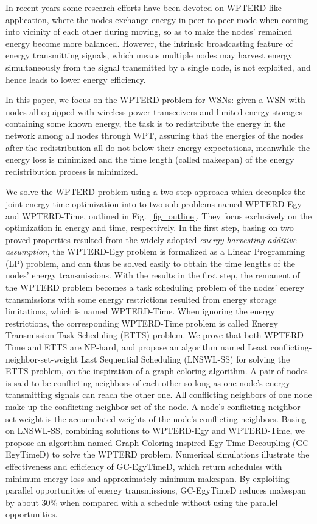 \documentclass[journal,10pt]{IEEEtran}
\begin{document}
In recent years some research efforts have been devoted on WPTERD-like application, where the nodes exchange energy in peer-to-peer mode when coming into vicinity of each other during moving, so as to make the nodes' remained energy become more balanced. However, the intrinsic broadcasting feature of energy transmitting signals, which means multiple nodes may harvest energy simultaneously from the signal transmitted by a single node, is not exploited, and hence leads to lower energy efficiency.

In this paper, we focus on the WPTERD problem for WSNs: given a WSN with nodes all equipped with wireless power transceivers and limited energy storages containing some known energy, the task is to redistribute the energy in the network among all nodes through WPT, assuring that the energies of the nodes after the redistribution all do not below their energy expectations, meanwhile the energy loss is minimized and the time length (called makespan) of the energy redistribution process is minimized.


We solve the WPTERD problem using a two-step approach which decouples the joint energy-time optimization into to two sub-problems named WPTERD-Egy and WPTERD-Time, outlined in Fig.~\ref{fig_outline}. They focus exclusively on the optimization in energy and time, respectively. In the first step, basing on two proved properties resulted from the widely adopted \textit{energy harvesting additive assumption}, the WPTERD-Egy problem is formalized as a Linear Programming (LP) problem, and can thus be solved easily to obtain the time lengths of the nodes' energy transmissions. With the results in the first step, the remanent of the WPTERD problem becomes a task scheduling problem of the nodes' energy transmissions with some energy restrictions resulted from energy storage limitations, which is named WPTERD-Time. When ignoring the energy restrictions, the corresponding WPTERD-Time problem is called Energy Transmission Task Scheduling (ETTS) problem. We prove that both WPTERD-Time and ETTS are NP-hard, and propose an algorithm named Least conflicting-neighbor-set-weight Last Sequential Scheduling (LNSWL-SS) for solving the ETTS problem, on the inspiration of a graph coloring algorithm. A pair of nodes is said to be conflicting neighbors of each other so long as one node's energy transmitting signals can reach the other one. All conflicting neighbors of one node make up the conflicting-neighbor-set of the node. A node's conflicting-neighbor-set-weight is the accumulated weights of the node's conflicting-neighbors. Basing on LNSWL-SS, combining solutions to WPTERD-Egy and WPTERD-Time, we propose an algorithm named Graph Coloring inspired Egy-Time Decoupling (GC-EgyTimeD) to solve the WPTERD problem. Numerical simulations illustrate the effectiveness and efficiency of GC-EgyTimeD, which return schedules with minimum energy loss and approximately minimum makespan. By exploiting parallel opportunities of energy transmissions, GC-EgyTimeD reduces makespan by about 30\% when compared with a schedule without using the parallel opportunities.
\end{document}
